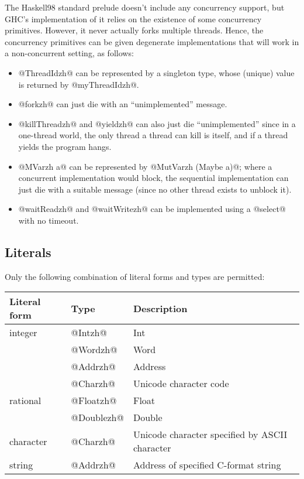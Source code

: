 \documentclass[10pt]{article}
\begin{document}
The Haskell98 standard prelude doesn't include any concurrency support, but GHC's
implementation of it relies on the existence of some concurrency primitives.  However,
it never actually forks multiple threads.  Hence, the concurrency primitives can
be given degenerate implementations that will work in a non-concurrent setting,
as follows:
\begin{itemize}
\item  @ThreadIdzh@ can be represented
by a singleton type, whose (unique) value is returned by @myThreadIdzh@.

\item @forkzh@ can just die with an ``unimplemented'' message.

\item @killThreadzh@ and @yieldzh@ can also just die ``unimplemented'' since
in a one-thread world, the only thread a thread can kill is itself, and
if a thread yields the program hangs.

\item @MVarzh a@ can be represented by @MutVarzh (Maybe a)@;
where a concurrent implementation would block, the sequential implementation can
just die with a suitable message (since no other thread exists to unblock it).

\item @waitReadzh@ and @waitWritezh@ can be implemented using a @select@ with no timeout. 
\end{itemize}

\subsection{Literals}

Only the following combination of literal forms and types are permitted:

\begin{tabular}{|l|l|l|}
\hline
Literal form & Type & Description \\
\hline 
integer	&  @Intzh@ & Int \\
	&  @Wordzh@ & Word \\
	&  @Addrzh@ & Address \\
	&  @Charzh@ & Unicode character code \\
rational & @Floatzh@ & Float \\
	 & @Doublezh@ & Double \\
character & @Charzh@ & Unicode character specified by ASCII character\\
string &  @Addrzh@  & Address of specified C-format string \\
\hline
\end{tabular}



\end{document}
